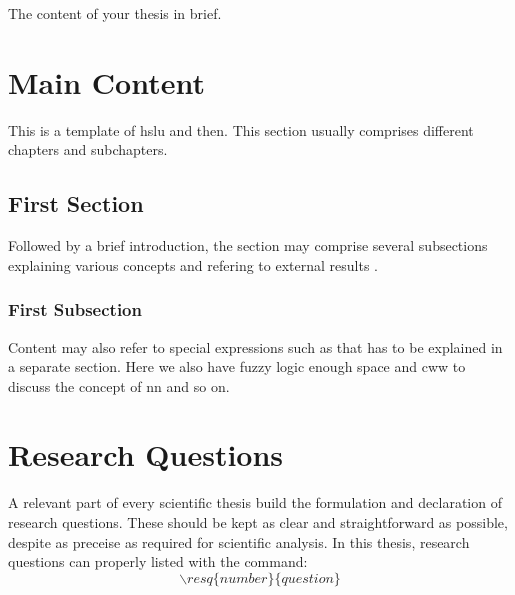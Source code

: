 \documentclass[english,bachelor,groupwork]{hsluthesis}
\begin{document}
\begin{abstractstyle}{\hsummary}
    The content of your thesis in brief.
\end{abstractstyle}

\tableofcontents
\listoffigures
\listoftables
\printnoidxglossaries



\mainmatter

\chapter{Main Content}
This is a template of \gls{hslu} and then. This section usually comprises different chapters and subchapters.

\section{First Section}
Followed by a brief introduction, the section may comprise several subsections explaining various concepts and refering to external results \cite{christen_exogenous_2020}.

\subsection{First Subsection}
Content may also refer to special expressions such as that has to be explained in a separate section. Here we also have \gls{fuzzy logic} enough space and \gls{cww} to discuss the concept of \gls{nn} and so on.

\chapter{Research Questions}
A relevant part of every scientific thesis build the formulation and declaration of research questions. These should be kept as clear and straightforward as possible, despite as preceise as required for scientific analysis. In this thesis, research questions can properly listed with the command:
\[\backslash resq\{number\}\{question\}\]
\end{document}
